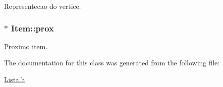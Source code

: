 Representecao do vertice. 

\hypertarget{class_item_aa80cddac5a6f4213726fbf01045cf604}{
\subsubsection[{prox}]{$\ast$ Item\-::prox\hspace{0.3cm}{\ttfamily [protected]}}}\label{class_item_aa80cddac5a6f4213726fbf01045cf604}


Proximo item. 



The documentation for this class was generated from the following file\-:\begin{DoxyCompactItemize}
\item 
\hyperlink{_lista_8h}{Lista.\-h}\end{DoxyCompactItemize}
